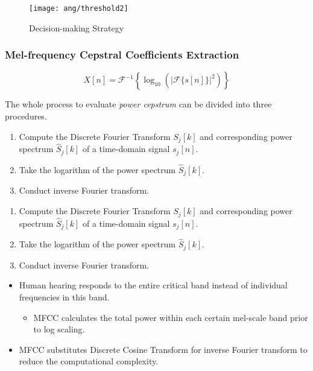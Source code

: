 
\begin{frame}
\begin{figure}[H]
\centering
\texttt{[image: ang/threshold2]}
\caption{Decision-making Strategy}
\end{figure}
\end{frame}


\begin{frame}
\frametitle{Mel-frequency Cepstral Coefficients Extraction}
\begin{equation}
X[n] = \mathcal{F}^{-1} \left\{\log_{10} \left( |\mathcal{F}\{s[n]\}|^2 \right) \right\}
\end{equation}
\vspace{10pt}

The whole process to evaluate \textit{power cepstrum} can be divided into three procedures.
\begin{enumerate}
\item Compute the Discrete Fourier Transform $S_j[k]$ and corresponding power spectrum $\hat{S}_j[k]$ of a time-domain signal $s_j[n]$.
\item Take the logarithm of the power spectrum $\hat{S}_j[k]$.
\item Conduct inverse Fourier transform.
\end{enumerate}
\end{frame}


\begin{frame}
\begin{enumerate}
\item Compute the Discrete Fourier Transform $S_j[k]$ and corresponding power spectrum $\hat{S}_j[k]$ of a time-domain signal $s_j[n]$.
\item Take the logarithm of the power spectrum $\hat{S}_j[k]$.
\item Conduct inverse Fourier transform.
\end{enumerate}
\vspace{10pt}

\begin{itemize}
	\item Human hearing responds to the entire critical band instead of individual frequencies in this band.
	\begin{itemize}
		\item MFCC calculates the total power within each certain mel-scale band prior to log scaling.
	\end{itemize}
	\item MFCC substitutes Discrete Cosine Transform for inverse Fourier transform to reduce the computational complexity.
\end{itemize}
\end{frame}
